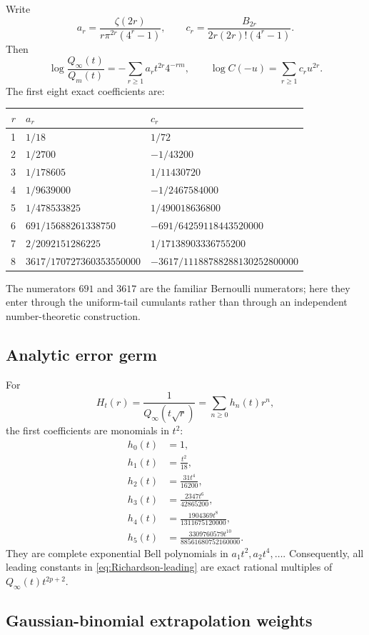 \documentclass[11pt,oneside]{article}
\numberwithin{equation}{section}
\theoremstyle{definition}
\theoremstyle{remark}
\begin{document}
Write
\[
 a_r=\frac{\zeta(2r)}{r\pi^{2r}(4^r-1)},
 \qquad
 c_r=\frac{B_{2r}}{2r(2r)!(4^r-1)}.
\]
Then
\[
 \log\frac{Q_\infty(t)}{Q_m(t)}=-\sum_{r\ge1}a_rt^{2r}4^{-rm},
 \qquad
 \log C(-u)=\sum_{r\ge1}c_ru^{2r}.
\]
The first eight exact coefficients are:
\begin{center}
\small
\begin{tabular}{@{}rll@{}}
\toprule
$r$ & $a_r$ & $c_r$\\
\midrule
1 & $1/18$ & $1/72$\\
2 & $1/2700$ & $-1/43200$\\
3 & $1/178605$ & $1/11430720$\\
4 & $1/9639000$ & $-1/2467584000$\\
5 & $1/478533825$ & $1/490018636800$\\
6 & $691/15688261338750$ & $-691/64259118443520000$\\
7 & $2/2092151286225$ & $1/17138903336755200$\\
8 & $3617/170727360353550000$ & $-3617/11188788288130252800000$\\
\bottomrule
\end{tabular}
\end{center}
The numerators $691$ and $3617$ are the familiar Bernoulli numerators; here they enter through
the uniform-tail cumulants rather than through an independent number-theoretic construction.

\subsection{Analytic error germ}

For
\[
 H_t(r)=\frac1{Q_\infty(t\sqrt r)}=\sum_{n\ge0}h_n(t)r^n,
\]
the first coefficients are monomials in $t^2$:
\begin{align*}
 h_0(t)&=1,\\
 h_1(t)&=\frac{t^2}{18},\\
 h_2(t)&=\frac{31t^4}{16200},\\
 h_3(t)&=\frac{2347t^6}{42865200},\\
 h_4(t)&=\frac{1904369t^8}{1311675120000},\\
 h_5(t)&=\frac{3309760579t^{10}}{88561680752160000}.
\end{align*}
They are complete exponential Bell polynomials in $a_1t^2,a_2t^4,\ldots$.  Consequently,
all leading constants in \eqref{eq:Richardson-leading} are exact rational multiples of
$Q_\infty(t)t^{2p+2}$.

\subsection{Gaussian-binomial extrapolation weights}
\end{document}
